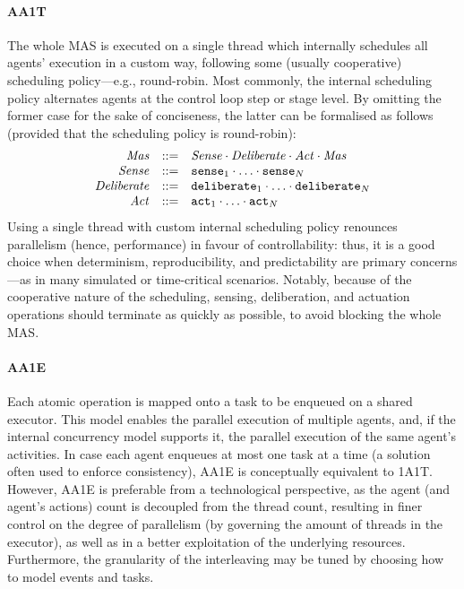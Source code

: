 \paragraph{\ac{AA1T}}

The whole \ac{MAS} is executed on a single thread which internally schedules all agents' execution in a custom way,
following some (usually cooperative) scheduling policy---e.g., round-robin.
%
Most commonly, 
the internal scheduling policy alternates agents at the control loop step or stage level.
%
By omitting the former case for the sake of conciseness, the latter can be formalised as follows (provided that the scheduling policy is round-robin):
%
\begin{equation}\label{eq:aaoel}
 \begin{array}{rcl}
   \V{mas} & \defeq & \V{sense} \cdot \V{deliberate} \cdot \V{act} \cdot \V{mas} \\
   \V{sense} & \defeq & \T{sense}_1 \cdot \ldots \cdot \T{sense}_N \\
   \V{deliberate} & \defeq & \T{deliberate}_1 \cdot \ldots \cdot \T{deliberate}_N \\
   \V{act} & \defeq & \T{act}_1 \cdot \ldots \cdot \T{act}_N \\
 \end{array}
\end{equation}
%
%
Using a single thread with custom internal scheduling policy renounces parallelism (hence, performance) in
favour of controllability:
thus, it is a good choice 
when determinism, reproducibility, and predictability are primary concerns---as in many simulated or time-critical scenarios. 
%
Notably,
because of the cooperative nature of the scheduling,
sensing, deliberation, and actuation operations should terminate as quickly as possible,
to avoid blocking the whole \ac{MAS}.

\paragraph{\ac{AA1E}}
Each atomic operation is mapped onto a task to be enqueued on a shared executor.
%
This model enables the parallel execution of multiple agents, and,
if the internal concurrency model supports it,
the parallel execution of the same agent's activities.
%
In case each agent enqueues at most one task at a time
(a solution often used to enforce consistency),
\ac{AA1E} is conceptually equivalent to \ac{1A1T}.
%
However, \ac{AA1E} is preferable from a technological perspective,
as the agent (and agent's actions) count is decoupled from the thread count,
resulting in finer control on the degree of parallelism
(by governing the amount of threads in the executor),
as well as in a better exploitation of the underlying resources.
%
Furthermore, 
the granularity of the interleaving may be tuned by choosing how to model events and tasks.

